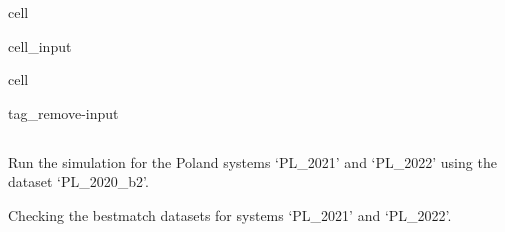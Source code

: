 \documentclass[letterpaper,10pt,english]{sphinxmanual}
\begin{document}
\begin{sphinxuseclass}{cell}
\begin{sphinxuseclass}{cell_input}
\begin{sphinxVerbatim}[commandchars=\\\{\}]
   
   
\end{sphinxVerbatim}

\end{sphinxuseclass}
\end{sphinxuseclass}
\begin{sphinxuseclass}{cell}
\begin{sphinxuseclass}{tag_remove-input}
\end{sphinxuseclass}
\end{sphinxuseclass}

\subsection{}
\label{\detokenize{notebooks/example:run-two-systems-with-default-parameters}}
\sphinxAtStartPar
Run the simulation for the Poland systems ‘PL\_2021’ and ‘PL\_2022’ using the dataset ‘PL\_2020\_b2’.

\sphinxAtStartPar
Checking the best\sphinxhyphen{}match datasets for systems ‘PL\_2021’ and ‘PL\_2022’.
\end{document}
